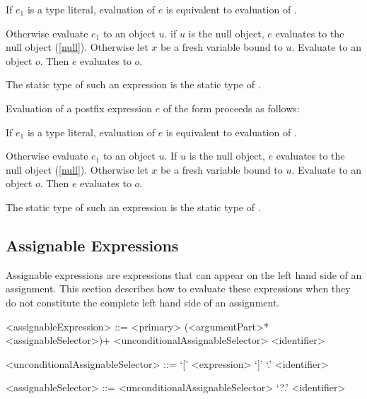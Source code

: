 \documentclass[makeidx]{article}
\begin{document}
\LMHash{}%
If $e_1$ is a type literal, evaluation of $e$ is equivalent to
evaluation of .

\LMHash{}%
Otherwise evaluate $e_1$ to an object $u$.
if $u$ is the null object, $e$ evaluates to the null object (\ref{null}).
Otherwise let $x$ be a fresh variable bound to $u$.
Evaluate  to an object $o$.
Then $e$ evaluates to $o$.

\LMHash{}%
The static type of such an expression is the static type of .

\LMHash{}%
Evaluation of a postfix expression $e$ of the form 
proceeds as follows:

If $e_1$ is a type literal, evaluation of $e$ is equivalent to
evaluation of .

Otherwise evaluate $e_1$ to an object $u$.
If $u$ is the null object, $e$ evaluates to the null object (\ref{null}).
Otherwise let $x$ be a fresh variable bound to $u$.
Evaluate  to an object $o$.
Then $e$ evaluates to $o$.

\LMHash{}%
The static type of such an expression is the static type of .


\subsection{Assignable Expressions}

\LMHash{}%
Assignable expressions are expressions that can appear on the left hand side of an assignment.
This section describes how to evaluate these expressions when they do not constitute the complete left hand side of an assignment.


\begin{grammar}
<assignableExpression> ::= <primary> (<argumentPart>* <assignableSelector>)+
  \alt \SUPER{} <unconditionalAssignableSelector>
  <identifier>

<unconditionalAssignableSelector> ::= `[' <expression> `]'
  \alt `.' <identifier>

<assignableSelector> ::= <unconditionalAssignableSelector>
  \alt `?.' <identifier>
\end{grammar}
\end{document}
